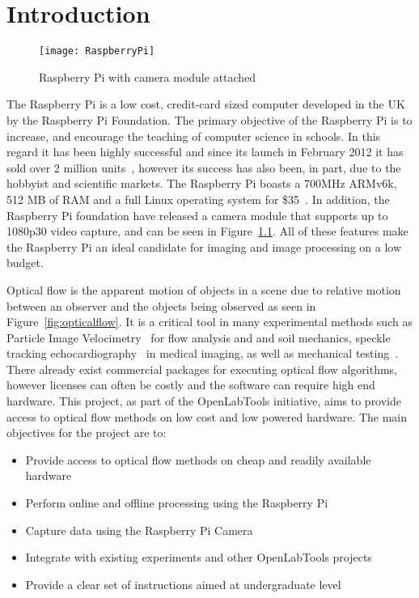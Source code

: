 \chapter{Introduction}

\ifpdf
    \graphicspath{{Section1/Figs/Raster/}{Section1/Figs/PDF/}{Section1/Figs/}}
\else
    \graphicspath{{Section1/Figs/Vector/}{Section1/Figs/}}
\fi

\begin{figure}[htpb]
  \centering
  \texttt{[image: RaspberryPi]}
  \caption{Raspberry Pi with camera module attached}
  \label{fig:raspi}
\end{figure}

The Raspberry Pi is a low cost, credit-card sized computer developed in the UK by the Raspberry Pi Foundation. The primary objective of the Raspberry Pi is to increase, and encourage the teaching of computer science in schools. In this regard it has been highly successful and since its launch in February 2012 it has sold over 2 million units~\cite{2mil}, however its success has also been, in part, due to the hobbyist and scientific markets. The Raspberry Pi boasts a 700MHz ARMv6k, 512 MB of RAM and a full Linux operating system for \$35~\cite{Broadcom-BCM2835-Website}. In addition, the Raspberry Pi foundation have released a camera module that supports up to 1080p30 video capture, and can be seen in Figure~\ref{fig:raspi}. All of these features make the Raspberry Pi an ideal candidate for imaging and image processing on a low budget.

Optical flow is the apparent motion of objects in a scene due to relative motion between an observer and the objects being observed as seen in Figure~\ref{fig:opticalflow}. It is a critical tool in many experimental methods such as Particle Image Velocimetry~\cite{quenot1998particle} for flow analysis and and soil mechanics, speckle tracking echocardiography~\cite{speckle} in medical imaging, as well as mechanical testing~\cite{harris2012characterizing}. There already exist commercial packages for executing optical flow algorithms, however licenses can often be costly and the software can require high end hardware. This project, as part of the OpenLabTools initiative, aims to provide access to optical flow methods on low cost and low powered hardware. The main objectives for the project are to:

\begin{itemize}
  \item Provide access to optical flow methods on cheap and readily available hardware
  \item Perform online and offline processing using the Raspberry Pi
  \item Capture data using the Raspberry Pi Camera
  \item Integrate with existing experiments and other OpenLabTools projects
  \item Provide a clear set of instructions aimed at undergraduate level
\end{itemize}

